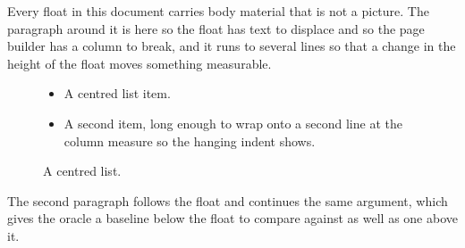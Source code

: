\documentclass{article}
\begin{document}
Every float in this document carries body material that is not a
picture. The paragraph around it is here so the float has text to displace and
so the page builder has a column to break, and it runs to several lines so that
a change in the height of the float moves something measurable.

\begin{figure}[h]
\centering
\begin{itemize}
\item A centred list item.
\item A second item, long enough to wrap onto a second line at the column
measure so the hanging indent shows.
\end{itemize}
\caption{A centred list.}
\end{figure}

The second paragraph follows the float and continues the same
argument, which gives the oracle a baseline below the float to compare against
as well as one above it.
\end{document}
